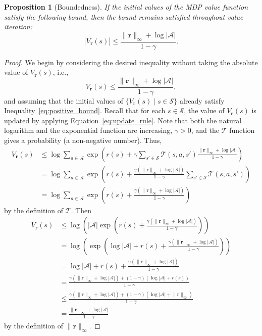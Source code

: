 \documentclass{mpaper}
\newtheorem{proposition}[theorem]{Proposition}
\newcommand{\V}{V_{\mathbf{r}}}
\newcommand{\vbound}{\frac{\rinf + \log|\mathcal{A}|}{1 - \gamma}}
\newcommand{\rinf}{\lVert \mathbf{r} \rVert_\infty}
\begin{document}
\begin{proposition}[Boundedness] \label{thm:bound}
  If the initial values of the MDP value function satisfy the following
  bound, then the bound remains satisfied throughout value iteration:
  \[
    |\V(s)| \le \vbound.
  \]
\end{proposition}
\begin{proof}
  We begin by considering the desired inequality without taking the absolute
  value of $\V(s)$, i.e.,
  \begin{equation} \label{eq:positive_bound}
    \V(s) \le \vbound,
  \end{equation}
  and assuming that the initial values of $\{ \V(s) \mid s \in \mathcal{S} \}$
  already satisfy Inequality~\eqref{eq:positive_bound}. Recall that for each $s
  \in \mathcal{S}$, the value of $\V(s)$ is updated by applying
  Equation~\eqref{eq:update_rule}. Note that both the natural logarithm and the
  exponential function are increasing, $\gamma > 0$, and the $\mathcal{T}$
  function gives a probability (a non-negative number). Thus,
  \begin{align*}
    \V(s) &\le \log \sum_{a \in \mathcal{A}} \exp\left( r(s) + \gamma\sum_{s' \in \mathcal{S}} \mathcal{T}(s, a, s')\frac{\rinf + \log|\mathcal{A}|}{1 - \gamma} \right) \\
          &= \log \sum_{a \in \mathcal{A}} \exp\left( r(s) + \frac{\gamma (\rinf + \log|\mathcal{A}|)}{1 - \gamma}\sum_{s' \in \mathcal{S}} \mathcal{T}(s, a, s') \right) \\
          &= \log \sum_{a \in \mathcal{A}} \exp\left( r(s) + \frac{\gamma (\rinf + \log|\mathcal{A}|)}{1 - \gamma} \right)
  \end{align*}
  by the definition of $\mathcal{T}$. Then
  \begin{align*}
    \V(s) &\le \log \left( |\mathcal{A}| \exp\left( r(s) + \frac{\gamma (\rinf + \log|\mathcal{A}|)}{1 - \gamma} \right) \right) \\
          &= \log \left( \exp\left( \log|\mathcal{A}| + r(s) + \frac{\gamma (\rinf + \log|\mathcal{A}|)}{1 - \gamma} \right) \right) \\
          &= \log|\mathcal{A}| + r(s) + \frac{\gamma (\rinf + \log|\mathcal{A}|)}{1 - \gamma} \\
          &= \frac{\gamma (\rinf + \log|\mathcal{A}|) + (1 - \gamma)(\log|\mathcal{A}| + r(s))}{1 - \gamma} \\
          &\le \frac{\gamma (\rinf + \log|\mathcal{A}|) + (1 - \gamma)(\log|\mathcal{A}| + \rinf)}{1 - \gamma} \\
          &= \vbound
  \end{align*}
  by the definition of $\rinf$.


\end{proof}
\end{document}
